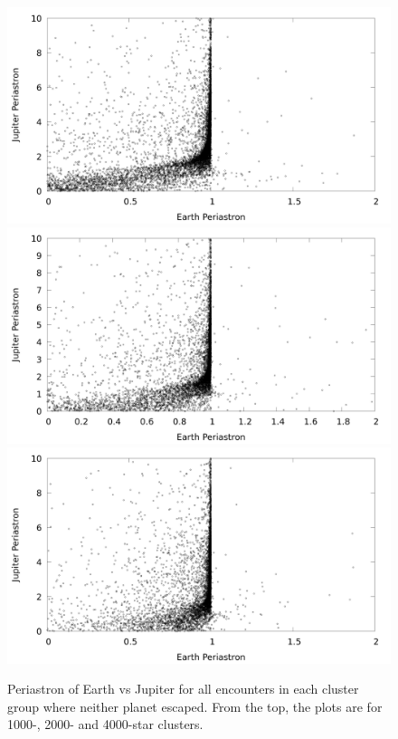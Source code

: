 \documentclass[12pt]{article}
\begin{document}
    \begin{figure}[H]
        \caption{Periastron of Earth vs Jupiter for all encounters
            in each cluster group where neither planet escaped. From the top,
            the plots are for 1000-, 2000- and 4000-star clusters.
        }
        \centering
        \label{fig:evj_peri}
        \includegraphics[width=5in]{evj_peri_earth_jupiter_1000} 
        \includegraphics[width=5in]{evj_peri_earth_jupiter_2000} 
        \includegraphics[width=5in]{evj_peri_earth_jupiter_4000} 
    \end{figure}
\end{document}
